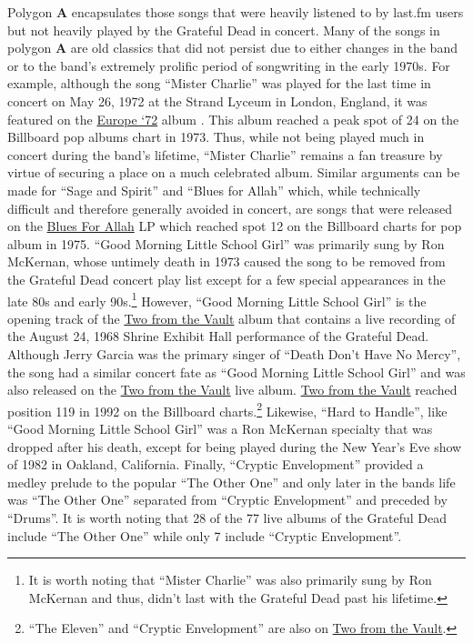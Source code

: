 \documentclass{svmult}
\newcommand{\ttt}[1]{``#1''}
\newcommand{\album}[1]{\uline{#1}}
\begin{document}
Polygon {\bf A} encapsulates those songs that were heavily listened to by last.fm users but not heavily played by the Grateful Dead in concert. Many of the songs in polygon {\bf A} are old classics that did not persist due to either changes in the band or to the band's extremely prolific period of songwriting in the early 1970s. For example, although the song \ttt{Mister Charlie} was played for the last time in concert on May 26, 1972 at the Strand Lyceum in London, England, it was featured on the \album{Europe `72} album \cite{europe:dead1972}.  This album reached a peak spot of 24 on the Billboard pop albums chart in 1973.  Thus, while not being played much in concert during the band's lifetime, \ttt{Mister Charlie} remains a fan treasure by virtue of securing a place on a much celebrated album. Similar arguments can be made for \ttt{Sage and Spirit} and \ttt{Blues for Allah} which, while technically difficult and therefore generally avoided in concert, are songs that were released on the \album{Blues For Allah} LP \cite{allah:dead1975} which reached spot 12 on the Billboard charts for pop album in 1975. \ttt{Good Morning Little School Girl} was primarily sung by Ron McKernan, whose untimely death in 1973 caused the song to be removed from the Grateful Dead concert play list except for a few special appearances in the late 80s and early 90s.\footnote{It is worth noting that \ttt{Mister Charlie} was also primarily sung by Ron McKernan and thus, didn't last with the Grateful Dead past his lifetime.} However, \ttt{Good Morning Little School Girl} is the opening track of the \album{Two from the Vault} album \cite{twovalut:dead1992} that contains a live recording of the August 24, 1968 Shrine Exhibit Hall performance of the Grateful Dead. Although Jerry Garcia was the primary singer of \ttt{Death Don't Have No Mercy}, the song had a similar concert fate as \ttt{Good Morning Little School Girl} and was also released on the \album{Two from the Vault} live album.  \album{Two from the Vault} reached position 119 in 1992 on the Billboard charts.\footnote{\ttt{The Eleven} and \ttt{Cryptic Envelopment} are also on \album{Two from the Vault}.} Likewise, \ttt{Hard to Handle}, like \ttt{Good Morning Little School Girl} was a Ron McKernan specialty that was dropped after his death, except for being played during the New Year's Eve show of 1982 in Oakland, California. Finally, \ttt{Cryptic Envelopment} provided a medley prelude to the popular \ttt{The Other One} and only later in the bands life was \ttt{The Other One} separated from \ttt{Cryptic Envelopment} and preceded by \ttt{Drums}. It is worth noting that 28 of the 77 live albums of the Grateful Dead include \ttt{The Other One} while only 7 include \ttt{Cryptic Envelopment}. 
\end{document}
